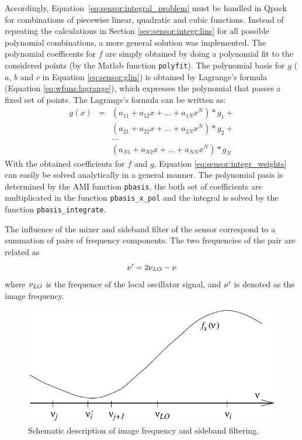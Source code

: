  Accordingly, Equation~\ref{eq:sensor:integral_problem} must be
 handled in Qpack for combinations of piecewise linear, quadratic and
 cubic functions. Instead of repeating the calculations in Section
 \ref{sec:sensor:integr:lins} for all possible polynomial
 combinations, a more general solution was implemented. The polynomial
 coefficents for $f$ are simply obtained by doing a polynomial fit to
 the considered points (by the Matlab function \verb|polyfit|). The
 polynomial basis for $g$ ($a$, $b$ and $c$ in Equation
 \ref{eq:sensor:glin}) is obtained by Lagrange's formula (Equation
 \ref{eq:wfuns:lagrange}), which expresses the polynomial that passes
 a fixed set of points. The Lagrange's formula can be written as:
 \begin{eqnarray}
  g(x) &=& (a_{11}+a_{12}x+\dots+a_{1N}x^N)*g_1 + \nonumber \\
       & & (a_{21}+a_{22}x+\dots+a_{2N}x^N)*g_2 + \nonumber \\
       & & \dots \nonumber \\
       & & (a_{N1}+a_{N2}x+\dots+a_{NN}x^N)*g_N 
  \label{eq:sensor:pbasis}
 \end{eqnarray}
 With the obtained coefficients for $f$ and $g$, Equation
 \ref{eq:sensor:integr_weights} can easily be solved analytically in a
 general manner. The polynomial pasis is determined by the AMI
 function \verb|pbasis|, the both set of coefficients are
 multiplicated in the function \verb|pbasis_x_pol| and the integral is
 solved by the function \verb|pbasis_integrate|.


 \label{sec:sensor:mixer}
  
 The influence of the mixer and sideband filter of the sensor
 correspond to a summation of pairs of frequency components. The two
 frequencies of the pair are related as
 \begin{equation}
    \nu' = 2\nu_{LO}-\nu
 \end{equation}
 where $\nu_{LO}$ is the frequence of the local oscillator signal, and
 $\nu'$ is denoted as the image frequency.

 \begin{figure}[tb]
  \begin{center}
    \includegraphics*[width=0.8\hsize]{Figs/sideband}
    \caption{Schematic description of image frequency and sideband filtering.}
   \label{fig:sensor:sideband} 
  \end{center} 
 \end{figure}
 
